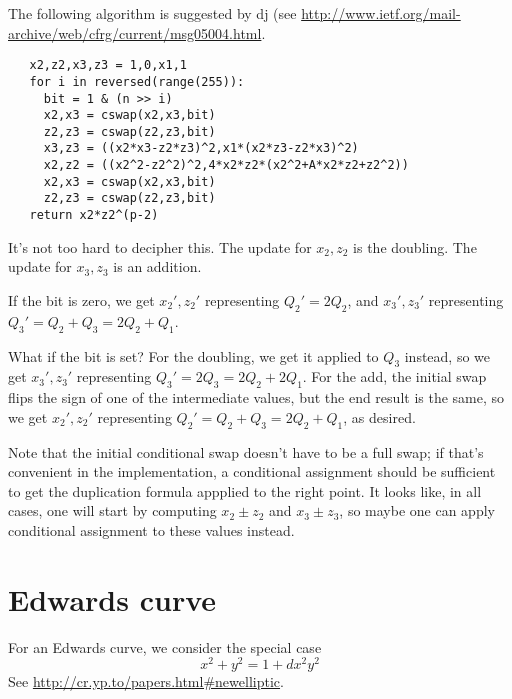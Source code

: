 \documentclass[a4paper]{article}
\begin{document}
The following algorithm is suggested by dj (see
\url{http://www.ietf.org/mail-archive/web/cfrg/current/msg05004.html}.
\begin{verbatim}
   x2,z2,x3,z3 = 1,0,x1,1
   for i in reversed(range(255)):
     bit = 1 & (n >> i)
     x2,x3 = cswap(x2,x3,bit)
     z2,z3 = cswap(z2,z3,bit)
     x3,z3 = ((x2*x3-z2*z3)^2,x1*(x2*z3-z2*x3)^2)
     x2,z2 = ((x2^2-z2^2)^2,4*x2*z2*(x2^2+A*x2*z2+z2^2))
     x2,x3 = cswap(x2,x3,bit)
     z2,z3 = cswap(z2,z3,bit)
   return x2*z2^(p-2)
\end{verbatim}
It's not too hard to decipher this. The update for $x_2, z_2$ is the
doubling. The update for $x_3, z_3$ is an addition.

If the bit is zero, we get $x_2', z_2'$ representing $Q_2' = 2 Q_2$,
and $x_3', z_3'$ representing $Q_3' = Q_2 + Q_3 = 2 Q_2 + Q_1$.

What if the bit is set? For the doubling, we get it applied to $Q_3$
instead, so we get $x_3', z_3'$ representing $Q_3' = 2 Q_3 = 2 Q_2 + 2
Q_1$. For the add, the initial swap flips the sign of one of the
intermediate values, but the end result is the same, so we get $x_2',
z_2'$ representing $Q_2' = Q_2 + Q_3 = 2 Q_2 + Q_1$, as desired.

Note that the initial conditional swap doesn't have to be a full swap;
if that's convenient in the implementation, a conditional assignment
should be sufficient to get the duplication formula appplied to the
right point. It looks like, in all cases, one will start by computing
$x_2 \pm z_2$ and $x_3 \pm z_3$, so maybe one can apply conditional
assignment to these values instead.

\section{Edwards curve}

For an Edwards curve, we consider the special case
\begin{equation*}
  x^2 + y^2 = 1 + d x^2 y^2
\end{equation*}
See \url{http://cr.yp.to/papers.html#newelliptic}.
\end{document}
